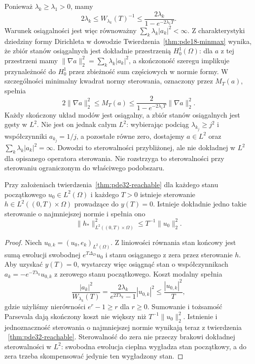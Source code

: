 \begin{uwaga}
Ponieważ $\lambda_k\ge\lambda_1>0$, mamy
\[
 2\lambda_k\le W_{\lambda_k}(T)^{-1}
 \le\frac{2\lambda_k}{1-e^{-2\lambda_1 T}}.
\]
Warunek osiągalności jest więc równoważny
$\sum_k\lambda_k|a_k|^2<\infty$.
Z charakterystyki dziedziny formy Dirichleta
w dowodzie Twierdzenia~\ref{thm:pde18-minmax}
wynika, że zbiór stanów osiągalnych jest dokładnie
przestrzenią $H_0^1(\Omega)$: dla $a$ z tej
przestrzeni mamy
$\|\nabla a\|_2^2=\sum_k\lambda_k|a_k|^2$,
a skończoność szeregu implikuje przynależność do
$H_0^1$ przez zbieżność sum częściowych w normie
formy. W szczególności minimalny kwadrat normy
sterowania, oznaczony przez $M_T(a)$, spełnia
\[
 2\|\nabla a\|_2^2\le M_T(a)
 \le\frac{2}{1-e^{-2\lambda_1T}}\|\nabla a\|_2^2 .
\]
Każdy skończony układ modów jest osiągalny,
a zbiór stanów osiągalnych jest gęsty w $L^2$.
Nie jest on jednak całym $L^2$: wybierając
podciąg $\lambda_{k_j}\ge j^2$ i współczynniki
$a_{k_j}=1/j$, a pozostałe równe zero, dostajemy
$a\in L^2$ oraz $\sum_k\lambda_k|a_k|^2=\infty$.
Dowodzi to sterowalności przybliżonej, ale nie
dokładnej w $L^2$ dla opisanego operatora sterowania.
Nie rozstrzyga to sterowalności przy sterowaniu
ograniczonym do właściwego podobszaru.
\end{uwaga}

\begin{wniosek}
\label{cor:pde32-null-control}
Przy założeniach twierdzenia~\ref{thm:pde32-reachable}
dla każdego stanu początkowego $u_0\in L^2(\Omega)$
i każdego $T>0$ istnieje sterowanie
$h\in L^2((0,T)\times\Omega)$ prowadzące do $y(T)=0$.
Istnieje dokładnie jedno takie sterowanie o najmniejszej
normie i spełnia ono
\[
 \|h_*\|_{L^2((0,T)\times\Omega)}^2
 \le T^{-1}\|u_0\|_2^2.
\]
\end{wniosek}
\begin{proof}
Niech $u_{0,k}=(u_0,e_k)_{L^2(\Omega)}$. Z liniowości
równania stan końcowy jest sumą ewolucji swobodnej
$e^{T\Delta_D}u_0$ i stanu osiąganego z zera
przez sterowanie $h$. Aby uzyskać $y(T)=0$,
wystarczy więc osiągnąć stan o współczynnikach
$a_k=-e^{-T\lambda_k}u_{0,k}$ z zerowego stanu
początkowego. Koszt modalny spełnia
\[
 \frac{|a_k|^2}{W_{\lambda_k}(T)}
 =\frac{2\lambda_k}{e^{2T\lambda_k}-1}|u_{0,k}|^2
 \le\frac{|u_{0,k}|^2}{T},
\]
gdzie użyliśmy nierówności $e^r-1\ge r$ dla $r\ge0$.
Sumowanie i tożsamość Parsevala dają skończony
koszt nie większy niż $T^{-1}\|u_0\|_2^2$.
Istnienie i jednoznaczność sterowania o najmniejszej
normie wynikają teraz z twierdzenia
~\ref{thm:pde32-reachable}. Sterowalność do zera
nie przeczy brakowi dokładnej sterowalności w $L^2$:
swobodna ewolucja cieplna wygładza stan początkowy,
a do zera trzeba skompensować jedynie ten wygładzony
stan.
\end{proof}

